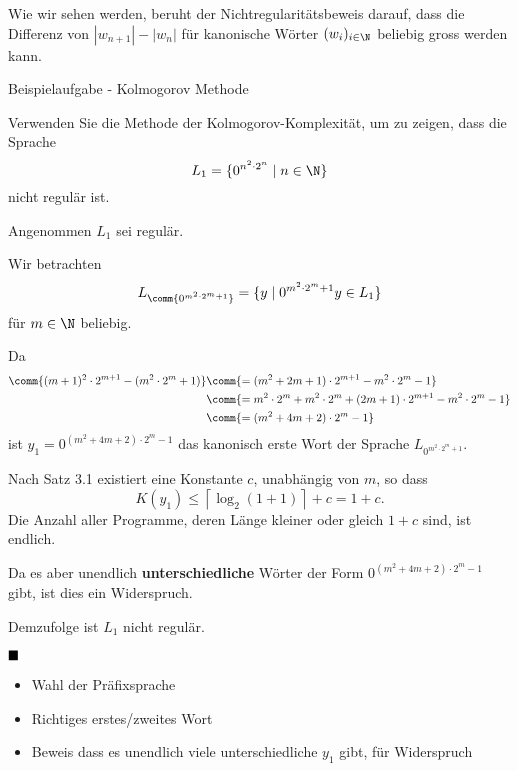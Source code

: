     Wie wir sehen werden, beruht der Nichtregularitätsbeweis darauf, dass die Differenz von $|w_{n+1}| - |w_n|$ für kanonische Wörter $(w_i)_{i \in \N}$ beliebig gross werden kann.



    \begin{subbox}{Beispielaufgabe - Kolmogorov Methode}

    Verwenden Sie die Methode der Kolmogorov-Komplexität, um zu zeigen, dass die Sprache 
    $$L_1 = \{0^{n^2 \cdot 2^n} \mid n \in \N\}$$
    nicht regulär ist.
    \end{subbox}

    Angenommen $L_1$ sei regulär. 
    
    Wir betrachten 
    $$L_{\comm{0^{m^2 \cdot 2^m + 1}}} = \{y \mid 0^{m^2 \cdot 2^m + 1}y \in L_1\}$$
    für \(m \in \N\) beliebig.

    Da
    \begin{align*}
        \comm{ (m+1)^2 \cdot 2^{m+1} - (m^2 \cdot 2^m + 1)}&\comm{= (m^2 + 2m + 1)\cdot 2^{m+1} - m^2\cdot2^m-1}\\
        &\comm{= m^2 \cdot 2^m + m^2 \cdot 2^m + (2m + 1) \cdot 2^{m+1}- m^2\cdot2^m-1}\\
        &\comm{= (m^2 + 4m + 2) \cdot 2^m-1}
    \end{align*}
    ist $y_1 = 0^{(m^2 + 4m + 2) \cdot 2^m - 1}$ das kanonisch erste Wort der Sprache $L_{0^{m^2\cdot 2^m +1}}$.

    Nach Satz 3.1 existiert eine Konstante $c$, unabhängig von $m$, so dass 
    $$K(y_1) \leq \left\lceil\log_2(1+1)\right\rceil + c = 1+ c.$$
    Die Anzahl aller Programme, deren Länge kleiner oder gleich $1 + c$ sind, ist endlich. 
    
    Da es aber unendlich \textbf{unterschiedliche} Wörter der Form $0^{(m^2 + 4m + 2) \cdot 2^m - 1}$ gibt, ist dies ein Widerspruch.

    Demzufolge ist $L_1$ nicht regulär.

    $\hfill\blacksquare$

\begin{itemize}
    \item Wahl der Präfixsprache
    \item Richtiges erstes/zweites Wort
    \item Beweis dass es unendlich viele unterschiedliche \(y_1\) gibt, für Widerspruch
\end{itemize}

